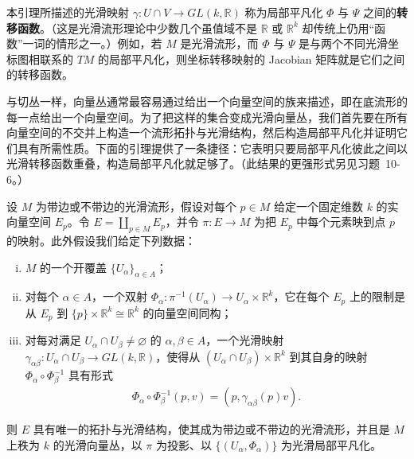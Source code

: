 \documentclass[../../main.tex]{subfiles}
\begin{document}
本引理所描述的光滑映射 $\gamma\colon U\cap V\to GL(k,\mathbb{R})$ 称为局部平凡化 $\Phi$ 与 $\Psi$ 之间的\textbf{转移函数}。（这是光滑流形理论中少数几个虽值域不是 $\mathbb{R}$ 或 $\mathbb{R}^k$ 却传统上仍用“函数”一词的情形之一。）例如，若 $M$ 是光滑流形，而 $\Phi$ 与 $\Psi$ 是与两个不同光滑坐标图相联系的 $TM$ 的局部平凡化，则坐标转移映射的 Jacobian 矩阵就是它们之间的转移函数。

与切丛一样，向量丛通常最容易通过给出一个向量空间的族来描述，即在底流形的每一点给出一个向量空间。为了把这样的集合变成光滑向量丛，我们首先要在所有向量空间的不交并上构造一个流形拓扑与光滑结构，然后构造局部平凡化并证明它们具有所需性质。下面的引理提供了一条捷径：它表明只要局部平凡化彼此之间以光滑转移函数重叠，构造局部平凡化就足够了。（此结果的更强形式另见习题~10-6。）

\begin{lemma}[向量丛坐标图引理]\label{lemma:ch10-向量丛坐标图引理}
设 $M$ 为带边或不带边的光滑流形，假设对每个 $p\in M$ 给定一个固定维数 $k$ 的实向量空间 $E_p$。令 $E=\coprod_{p\in M}E_p$，并令 $\pi\colon E\to M$ 为把 $E_p$ 中每个元素映到点 $p$ 的映射。此外假设我们给定下列数据：
\begin{enumerate}[(i)]
\item $M$ 的一个开覆盖 $\{U_\alpha\}_{\alpha\in A}$；
\item 对每个 $\alpha\in A$，一个双射 $\Phi_\alpha\colon\pi^{-1}(U_\alpha)\to U_\alpha\times\mathbb{R}^k$，它在每个 $E_p$ 上的限制是从 $E_p$ 到 $\{p\}\times\mathbb{R}^k\cong\mathbb{R}^k$ 的向量空间同构；
\item 对每对满足 $U_\alpha\cap U_\beta\neq\varnothing$ 的 $\alpha,\beta\in A$，一个光滑映射 $\gamma_{\alpha\beta}\colon U_\alpha\cap U_\beta\to GL(k,\mathbb{R})$，使得从 $(U_\alpha\cap U_\beta)\times\mathbb{R}^k$ 到其自身的映射 $\Phi_\alpha\circ\Phi_\beta^{-1}$ 具有形式
\begin{align}
\Phi_\alpha\circ\Phi_\beta^{-1}(p,v)=(p,\gamma_{\alpha\beta}(p)v).\label{align:ch10-转移协调}
\end{align}
\end{enumerate}
则 $E$ 具有唯一的拓扑与光滑结构，使其成为带边或不带边的光滑流形，并且是 $M$ 上秩为 $k$ 的光滑向量丛，以 $\pi$ 为投影、以 $\{(U_\alpha,\Phi_\alpha)\}$ 为光滑局部平凡化。
\end{lemma}
\end{document}
